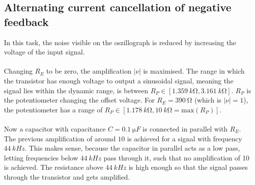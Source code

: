 \documentclass[a4paper,10pt]{article}
\numberwithin{equation}{section}
\begin{document}
\begin{multicols}{2}
        \subsection{Alternating current cancellation of negative feedback}
        In this task, the noise visible on the oszillograph is reduced by increasing the voltage of the input signal.
        \\\\Changing $R_E$ to be zero, the amplification $|\nu |$ is maximised.
        The range in which the transistor has enough voltage to output a sinusoidal signal, meaning the signal lies within the dynamic range, is between $R_P  \in  \left[\SI{1.359}{k\ohm},\SI{3.161}{k\ohm}\right]$.
        $R_P$ is the potentiometer changing the offset voltage.
        For $R_E=\SI{390}{\ohm}$ (which is $|\nu |=1$), the potentiometer has a range of $R_P  \in  \left[\SI{1.178}{k\ohm},\SI{10}{k\ohm}=\text{max}\left(R_P\right)\right]$.
        \\\\Now a capacitor with capacitance $C=\SI{0.1}{\micro F}$ is connected in parallel with $R_E$.
        The previous amplification of around $10$ is achieved for a signal with frequency $\SI{44}{kHz}$.
        This makes sense, because the capacitor in parallel acts as a low pass, letting frequencies below $\SI{44}{kHz}$ pass through it, such that no amplification of 10 is achieved.
        The resistance above $\SI{44}{kHz}$ is high enough so that the signal passes through the transistor and gets amplified.


\end{multicols}
\end{document}
